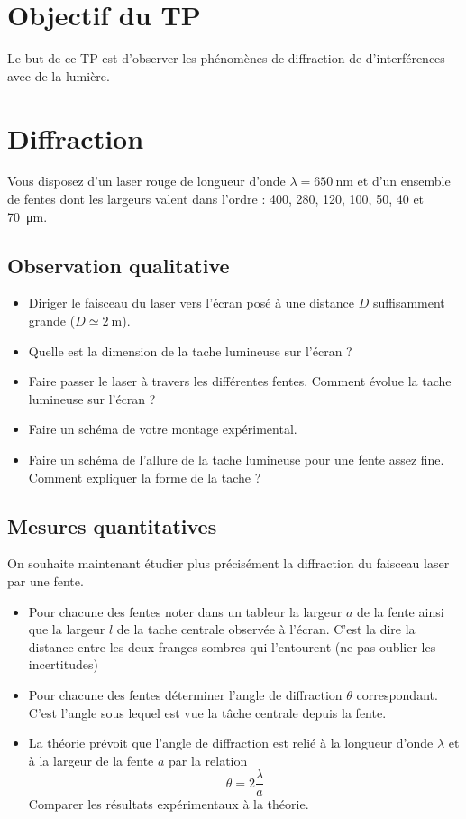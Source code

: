 \documentclass{tp}
\begin{document}

\section{Objectif du TP}
Le but de ce TP est d'observer les phénomènes de diffraction de d'interférences avec de la lumière. 

\section{Diffraction} 

Vous disposez d'un laser rouge de longueur d'onde $\lambda=\SI{650}{\nm}$ et d'un ensemble de fentes dont les largeurs valent dans l'ordre : 400, 280, 120, 100, 50, 40 et \SI{70}{\micro\meter}.
\subsection{Observation qualitative}
\begin{itemize}
\item Diriger le faisceau du laser vers l'écran posé à une distance $D$ suffisamment grande ($D\simeq\SI{2}{\m}$). 
\item Quelle est la dimension de la tache lumineuse sur l'écran ?
\item Faire passer le laser à travers les différentes fentes. Comment évolue la tache lumineuse sur l'écran ? 
\item Faire un schéma de votre montage expérimental.
\item Faire un schéma de l'allure de la tache lumineuse pour une fente assez fine. Comment expliquer la forme de la tache ?
\end{itemize}

\subsection{Mesures quantitatives}
On souhaite maintenant étudier plus précisément la diffraction du faisceau laser par une fente.
\begin{itemize}
  \item Pour chacune des fentes noter dans un tableur la largeur $a$ de la fente ainsi que la largeur $l$ de la tache centrale observée à l'écran. C'est la dire la distance entre les deux franges sombres qui l'entourent (ne pas oublier les incertitudes)
  \item Pour chacune des fentes déterminer l'angle de diffraction $\theta$ correspondant. C'est l'angle sous lequel est vue la tâche centrale depuis la fente.
  \item La théorie prévoit que l'angle de diffraction est relié à la longueur d'onde $\lambda$ et à la largeur de la fente $a$ par la relation 
  \begin{equation*}
    \theta = 2 \frac{\lambda}{a}
  \end{equation*}
  Comparer les résultats expérimentaux à la théorie.
\end{itemize}
\end{document}
